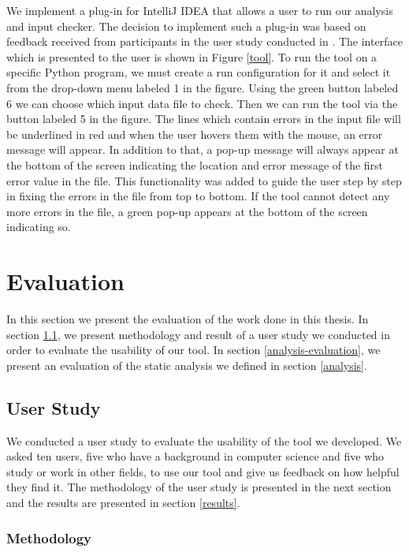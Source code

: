 \documentclass[10pt]{report}
\begin{document}
We implement a plug-in for IntelliJ IDEA that allows a user to run our analysis and input checker. The decision to implement such a plug-in was based on feedback received from participants in the user study conducted in \cite{madelin}. The interface which is presented to the user is shown in Figure \ref{tool}. To run the tool on a specific Python program, we must create a run configuration for it and select it from the drop-down menu labeled 1 in the figure. Using the green button labeled 6 we can choose which input data file to check. Then we can run the tool via the button labeled 5 in the figure. The lines which contain errors in the input file will be underlined in red and when the user hovers them with the mouse, an error message will appear. In addition to that, a pop-up message will always appear at the bottom of the screen indicating the location and error message of the first error value in the file. This functionality was added to guide the user step by step in fixing the errors in the file from top to bottom. If the tool cannot detect any more errors in the file, a green pop-up appears at the bottom of the screen indicating so. 
  

\chapter{Evaluation} \label{evaluation}

In this section we present the evaluation of the work done in this thesis. In section \ref{user-study}, we present methodology and result of a user study we conducted in order to evaluate the usability of our tool. In section \ref{analysis-evaluation}, we present an evaluation of the static analysis we defined in section \ref{analysis}. 

\section{User Study} \label{user-study}
We conducted a user study to evaluate the usability of the tool we developed. We asked ten users, five who have a background in computer science and five who study or work in other fields, to use our tool and give us feedback on how helpful they find it. The methodology of the user study is presented in the next section and the results are presented in section \ref{results}. 

\subsection{Methodology} \label{methodology}
\end{document}
